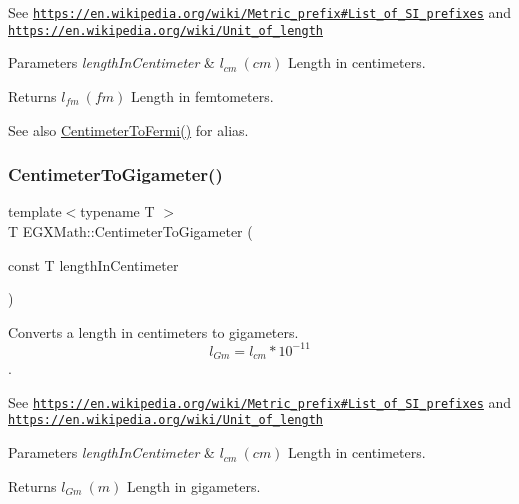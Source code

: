 See \href{https://en.wikipedia.org/wiki/Metric_prefix#List_of_SI_prefixes}{\tt https\+://en.\+wikipedia.\+org/wiki/\+Metric\+\_\+prefix\#\+List\+\_\+of\+\_\+\+S\+I\+\_\+prefixes} and \href{https://en.wikipedia.org/wiki/Unit_of_length}{\tt https\+://en.\+wikipedia.\+org/wiki/\+Unit\+\_\+of\+\_\+length} 
\begin{DoxyParams}{Parameters}
{\em length\+In\+Centimeter} & $ l_{cm}\ (cm)$ Length in centimeters. \\
\hline
\end{DoxyParams}
\begin{DoxyReturn}{Returns}
$ l_{fm}\ (fm)$ Length in femtometers. 
\end{DoxyReturn}
\begin{DoxySeeAlso}{See also}
\mbox{\hyperlink{group___e_g_x_math-_conversions-_length_conversions-_s_i-_centimeter-_non-_s_i_ga0b55e847f11e0ba8313d4556d23684dd}{Centimeter\+To\+Fermi()}} for alias. 
\end{DoxySeeAlso}
\mbox{\label{group___e_g_x_math-_conversions-_length_conversions-_s_i-_centimeter-_s_i_gaf3656a809d74231d75f33a9485e4f454}} 
\subsubsection{\texorpdfstring{Centimeter\+To\+Gigameter()}{CentimeterToGigameter()}}
{\footnotesize\ttfamily template$<$typename T $>$ \\
T E\+G\+X\+Math\+::\+Centimeter\+To\+Gigameter (\begin{DoxyParamCaption}\item[{const T}]{length\+In\+Centimeter }\end{DoxyParamCaption})}



Converts a length in centimeters to gigameters. \[ l_{Gm}=l_{cm} * 10^{-11} \]. 

See \href{https://en.wikipedia.org/wiki/Metric_prefix#List_of_SI_prefixes}{\tt https\+://en.\+wikipedia.\+org/wiki/\+Metric\+\_\+prefix\#\+List\+\_\+of\+\_\+\+S\+I\+\_\+prefixes} and \href{https://en.wikipedia.org/wiki/Unit_of_length}{\tt https\+://en.\+wikipedia.\+org/wiki/\+Unit\+\_\+of\+\_\+length} 
\begin{DoxyParams}{Parameters}
{\em length\+In\+Centimeter} & $ l_{cm}\ (cm)$ Length in centimeters. \\
\hline
\end{DoxyParams}
\begin{DoxyReturn}{Returns}
$ l_{Gm}\ (m)$ Length in gigameters. 
\end{DoxyReturn}
\mbox{\label{group___e_g_x_math-_conversions-_length_conversions-_s_i-_centimeter-_s_i_ga311c96c2d32cb295453bff9cbdfd8cdc}} 
